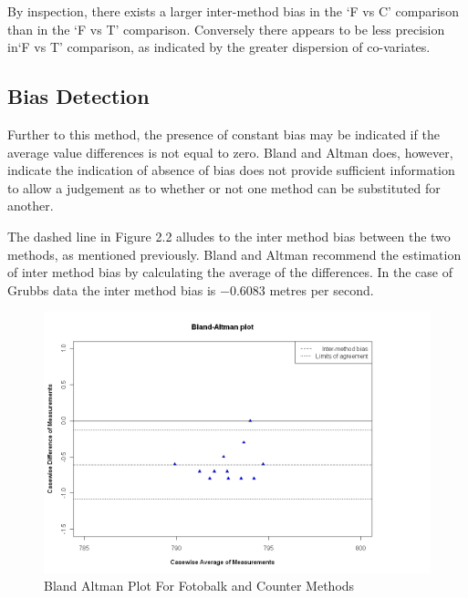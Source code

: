 \documentclass[Main.tex]{subfiles}
\begin{document}
	
	By inspection, there exists a larger inter-method bias in the `F
	vs C' comparison than in the `F vs T' comparison. Conversely there
	appears to be less precision in`F vs T' comparison, as indicated
	by the greater dispersion of co-variates.


\subsection{Bias Detection}
Further to this method, the presence of constant bias may be
indicated if the average value differences is not equal to zero. Bland and Altman does, however, indicate the indication of absence
of bias does not provide sufficient information to allow a judgement as to whether or not one method can be substituted for
another.


	
	
	The dashed line in Figure 2.2 alludes to the inter method bias
	between the two methods, as mentioned previously. Bland and Altman
	recommend the estimation of inter method bias by calculating the
	average of the differences. In the case of Grubbs data the inter
	method bias is $-0.6083$ metres per second.

	\begin{figure}[h!]
		\begin{center}
			\includegraphics[width=120mm]{images/GrubbsBAplot.jpeg}
			\caption{Bland Altman Plot For Fotobalk and Counter Methods}\label{GrubbsBA}
		\end{center}
	\end{figure}
\end{document}
